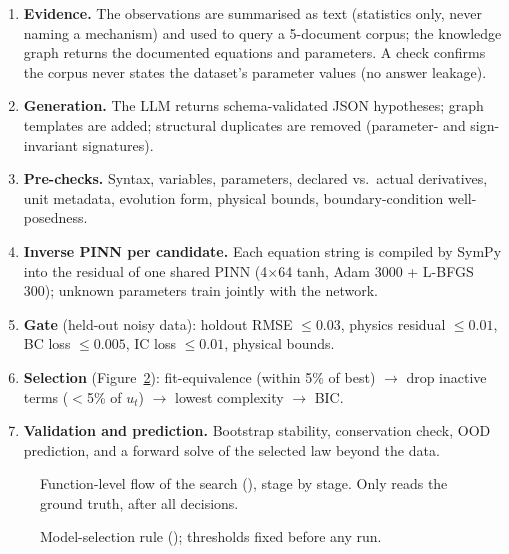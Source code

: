 \documentclass[11pt,a4paper]{article}
\begin{document}
\begin{enumerate}
  \item \textbf{Evidence.} The observations are summarised as text (statistics only, never naming a mechanism) and used
        to query a 5-document corpus; the knowledge graph returns the documented equations and parameters. A check
        confirms the corpus never states the dataset's parameter values (no answer leakage).
  \item \textbf{Generation.} The LLM returns schema-validated JSON hypotheses; graph templates are added; structural
        duplicates are removed (parameter- and sign-invariant signatures).
  \item \textbf{Pre-checks.} Syntax, variables, parameters, declared vs.\ actual derivatives, unit metadata, evolution
        form, physical bounds, boundary-condition well-posedness.
  \item \textbf{Inverse PINN per candidate.} Each equation string is compiled by SymPy into the residual of one shared
        PINN (4$\times$64 tanh, Adam 3000 + L-BFGS 300); unknown parameters train jointly with the network.
  \item \textbf{Gate} (held-out noisy data): holdout RMSE $\le0.03$, physics residual $\le0.01$, BC loss $\le0.005$,
        IC loss $\le0.01$, physical bounds.
  \item \textbf{Selection} (Figure~\ref{fig:selection}): fit-equivalence (within 5\% of best) $\to$ drop inactive terms
        ($<$5\% of $u_t$) $\to$ lowest complexity $\to$ BIC.
  \item \textbf{Validation and prediction.} Bootstrap stability, conservation check, OOD prediction, and a forward solve
        of the selected law beyond the data.
\end{enumerate}

\begin{figure}[p]
\centering

\pkglegend
\caption{Function-level flow of the search (), stage by stage.
Only  reads the ground truth, after all decisions.}
\label{fig:p6}
\end{figure}

\begin{figure}[!htb]
\centering

\caption{Model-selection rule (); thresholds fixed before any run.}
\label{fig:selection}
\end{figure}
\end{document}
